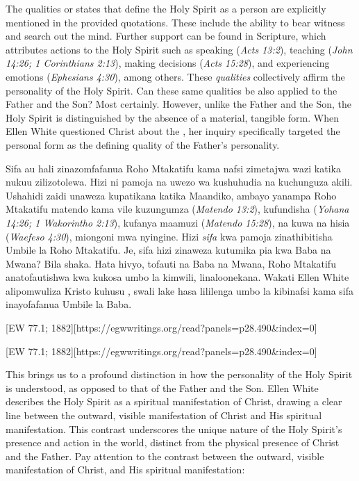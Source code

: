 The qualities or states that define the Holy Spirit as a person are explicitly mentioned in the provided quotations. These include the ability to bear witness and search out the mind. Further support can be found in Scripture, which attributes actions to the Holy Spirit such as speaking (\textit{Acts 13:2}), teaching (\textit{John 14:26; 1 Corinthians 2:13}), making decisions (\textit{Acts 15:28}), and experiencing emotions (\textit{Ephesians 4:30}), among others. These \textit{qualities }collectively affirm the personality of the Holy Spirit. Can these same qualities be also applied to the Father and the Son? Most certainly. However, unlike the Father and the Son, the Holy Spirit is distinguished by the absence of a material, tangible form. When Ellen White questioned Christ about the , her inquiry specifically targeted the personal form as the defining quality of the Father's personality.


Sifa au hali zinazomfafanua Roho Mtakatifu kama nafsi zimetajwa wazi katika nukuu zilizotolewa. Hizi ni pamoja na uwezo wa kushuhudia na kuchunguza akili. Ushahidi zaidi unaweza kupatikana katika Maandiko, ambayo yanampa Roho Mtakatifu matendo kama vile kuzungumza (\textit{Matendo 13:2}), kufundisha (\textit{Yohana 14:26; 1 Wakorintho 2:13}), kufanya maamuzi (\textit{Matendo 15:28}), na kuwa na hisia (\textit{Waefeso 4:30}), miongoni mwa nyingine. Hizi \textit{sifa} kwa pamoja zinathibitisha Umbile la Roho Mtakatifu. Je, sifa hizi zinaweza kutumika pia kwa Baba na Mwana? Bila shaka. Hata hivyo, tofauti na Baba na Mwana, Roho Mtakatifu anatofautishwa kwa kukosa umbo la kimwili, linaloonekana. Wakati Ellen White alipomwuliza Kristo kuhusu , swali lake hasa lililenga umbo la kibinafsi kama sifa inayofafanua Umbile la Baba.


[EW 77.1; 1882][https://egwwritings.org/read?panels=p28.490&index=0]


[EW 77.1; 1882][https://egwwritings.org/read?panels=p28.490&index=0]


This brings us to a profound distinction in how the personality of the Holy Spirit is understood, as opposed to that of the Father and the Son. Ellen White describes the Holy Spirit as a spiritual manifestation of Christ, drawing a clear line between the outward, visible manifestation of Christ and His spiritual manifestation. This contrast underscores the unique nature of the Holy Spirit's presence and action in the world, distinct from the physical presence of Christ and the Father. Pay attention to the contrast between the outward, visible manifestation of Christ, and His spiritual manifestation:


